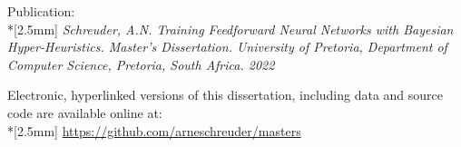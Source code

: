 \pagestyle{empty}
\vspace*{\fill}
\small

\noindent
\textsf{Publication:}\\*[2.5mm]
\textsf{
    \fontsize{9}{10pt}
    \selectfont
    \textit{
        Schreuder, A.N. Training Feedforward Neural Networks with Bayesian
        Hyper-Heuristics. Master's Dissertation. University of Pretoria,
        Department of Computer Science, Pretoria, South Africa.
        2022
    }
}
\vspace{1cm}

\noindent
\textsf{Electronic, hyperlinked versions of this dissertation, including
    data and source code are available online at:}\\*[2.5mm]
\textsf{
    \fontsize{9}{10pt}
    \selectfont
    \url{https://github.com/arneschreuder/masters}
}
\newpage
